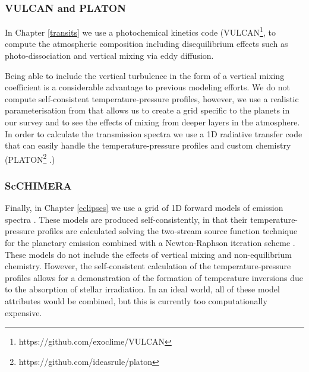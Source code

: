 \subsubsection{VULCAN and PLATON}

In Chapter \ref{transits} we use a photochemical kinetics code (VULCAN\footnote{https://github.com/exoclime/VULCAN}, \citet{Tsai2017} to compute the atmospheric composition including disequilibrium effects such as photo-dissociation and vertical mixing via eddy diffusion.

Being able to include the vertical turbulence in the form of a vertical mixing coefficient is a considerable advantage to previous modeling efforts. We do not compute self-consistent temperature-pressure profiles, however, we use a realistic parameterisation from \citet{Heng2014} that allows us to create a grid specific to the planets in our survey and to see the effects of mixing from deeper layers in the atmosphere. In order to calculate the transmission spectra we use a 1D radiative transfer code that can easily handle the temperature-pressure profiles and custom chemistry (PLATON\footnote{https://github.com/ideasrule/platon} \citet{Zhang2019}.)


\subsubsection{ScCHIMERA}

Finally, in Chapter \ref{eclipses} we use a grid of 1D forward models of emission spectra \citep{Piskorz2018, Line2013a}. These models are produced self-consistently, in that their temperature-pressure profiles are calculated solving the two-stream source function technique for the planetary emission combined with a Newton-Raphson iteration scheme \citep{McKay1989}. These models do not include the effects of vertical mixing and non-equilibrium chemistry. However, the self-consistent calculation of the temperature-pressure profiles allows for a demonstration of the formation of temperature inversions due to the absorption of stellar irradiation. In an ideal world, all of these model attributes would be combined, but this is currently too computationally expensive.


